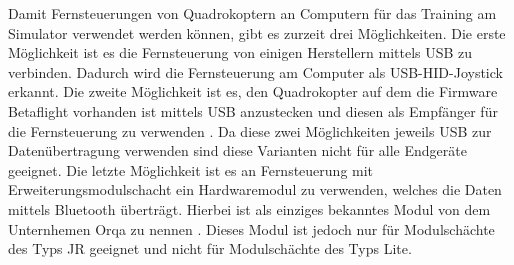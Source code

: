 Damit Fernsteuerungen von Quadrokoptern an Computern für das Training am Simulator verwendet werden können, gibt es zurzeit drei Möglichkeiten. Die erste Möglichkeit ist es die Fernsteuerung von einigen Herstellern mittels USB zu verbinden. Dadurch wird die Fernsteuerung am Computer als USB-\acs{HID}-Joystick erkannt\cite{opentxJoystick}. Die zweite Möglichkeit ist es, den Quadrokopter auf dem die Firmware Betaflight vorhanden ist mittels USB anzustecken und diesen als Empfänger für die Fernsteuerung zu verwenden \cite{betaflightHID}. Da diese zwei Möglichkeiten jeweils USB zur Datenübertragung verwenden sind diese Varianten nicht für alle Endgeräte geeignet. Die letzte Möglichkeit ist es an Fernsteuerung mit Erweiterungsmodulschacht ein Hardwaremodul zu verwenden, welches die Daten mittels Bluetooth überträgt. Hierbei ist als einziges bekanntes Modul von dem Unternhemen Orqa zu nennen \cite{orqaBluetoothModule}. Dieses Modul ist jedoch nur für Modulschächte des Typs JR geeignet und nicht für Modulschächte des Typs Lite.